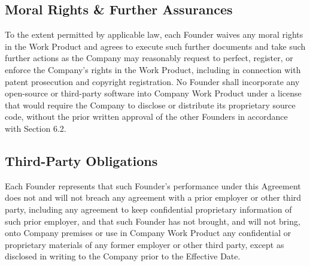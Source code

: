 \subsection{Moral Rights \& Further Assurances} To the extent permitted by applicable law, each Founder waives any moral rights in the Work Product and agrees to execute such further documents and take such further actions as the Company may reasonably request to perfect, register, or enforce the Company's rights in the Work Product, including in connection with patent prosecution and copyright registration. No Founder shall incorporate any open-source or third-party software into Company Work Product under a license that would require the Company to disclose or distribute its proprietary source code, without the prior written approval of the other Founders in accordance with Section 6.2.

\subsection{Third-Party Obligations} Each Founder represents that such Founder's performance under this Agreement does not and will not breach any agreement with a prior employer or other third party, including any agreement to keep confidential proprietary information of such prior employer, and that such Founder has not brought, and will not bring, onto Company premises or use in Company Work Product any confidential or proprietary materials of any former employer or other third party, except as disclosed in writing to the Company prior to the Effective Date.
